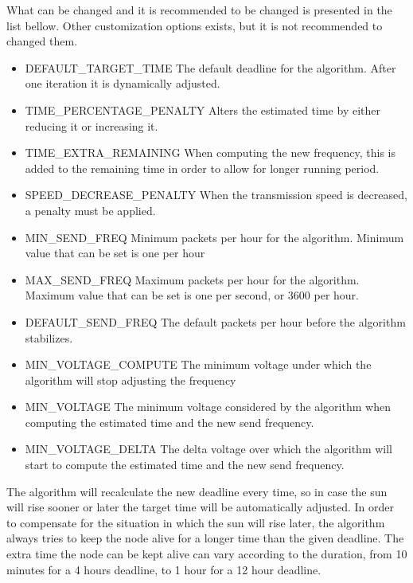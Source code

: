 What can be changed and it is recommended to be changed is presented in the list bellow.  Other
customization options exists, but it is not recommended to changed them.

\begin{itemize}
    \item DEFAULT\_TARGET\_TIME The default deadline for the algorithm. After one iteration it is
        dynamically adjusted.
    \item TIME\_PERCENTAGE\_PENALTY Alters the estimated time by either reducing it or increasing
        it.
    \item TIME\_EXTRA\_REMAINING When computing the new frequency, this is added to the remaining
        time in order to allow for longer running period.
    \item SPEED\_DECREASE\_PENALTY When the transmission speed is decreased, a penalty must be
        applied.
    \item MIN\_SEND\_FREQ  Minimum packets per hour for the algorithm. Minimum value that can be
        set is one per hour
    \item MAX\_SEND\_FREQ  Maximum packets per hour for the algorithm. Maximum value that can be
        set is one per second, or 3600 per hour.
    \item DEFAULT\_SEND\_FREQ The default packets per hour before the algorithm stabilizes.
    \item MIN\_VOLTAGE\_COMPUTE The minimum voltage under which the algorithm will stop adjusting
        the frequency
    \item MIN\_VOLTAGE The minimum voltage considered by the algorithm when computing the estimated
        time and the new send frequency.
    \item MIN\_VOLTAGE\_DELTA The delta voltage over which the algorithm will start to compute the
        estimated time and the new send frequency.
\end{itemize}


The algorithm will recalculate the new deadline every time, so in case the sun will rise sooner or later the
target time will be automatically adjusted. In order to compensate for the situation in which the
sun will rise later, the algorithm always tries to keep the node alive for a
longer time than the given deadline. The extra time the node can be kept alive can vary according
to the duration, from 10 minutes for a 4 hours deadline, to 1 hour for a 12 hour deadline.


